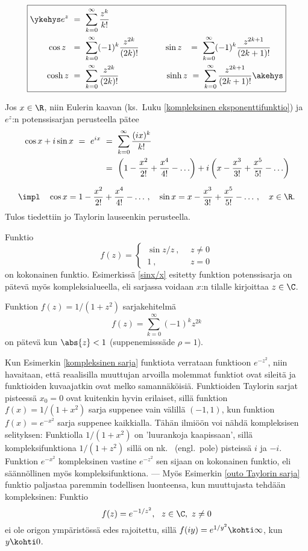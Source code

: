 \[ \boxed{ \begin{aligned}
  \ykehys e^z\ &=\ \sum_{k=0}^\infty \frac{z^k}{k!} \\
     \cos z\ \ &=\ \sum_{k=0}^\infty (-1)^k \frac{z^{2k}}{(2k)!} \qquad\quad 
    \sin z\,\ \ =\ \sum_{k=0}^\infty (-1)^k \frac{z^{2k+1}}{(2k+1)!} \quad \\
\quad \cosh z\ &=\ \sum_{k=0}^\infty \frac{z^{2k}}{(2k)!} \qquad\qquad\quad\,\
       \sinh z\ =\ \sum_{k=0}^\infty \frac{z^{2k+1}}{(2k+1)!} \akehys
           \end{aligned} } \]
\begin{Exa} Jos $x\in\R$, niin Eulerin kaavan
(ks.\ Luku \ref{kompleksinen eksponenttifunktio}) ja $e^z$:n potenssisarjan perusteella pätee
\begin{align*}
\cos x + i\sin x\ =\ e^{ix}\ &=\ \sum_{k=0}^\infty \frac{(ix)^k}{k!} \\
                            &=\ \left(1-\frac{x^2}{2!}+\frac{x^4}{4!}- \ldots \right)
                              + i\left(x-\frac{x^3}{3!}+\frac{x^5}{5!}- \ldots \right) \\[2mm]
\impl\quad \cos x = 1-\frac{x^2}{2!}&+\frac{x^4}{4!}-\ldots\,, \quad \sin x 
                  = x-\frac{x^3}{3!}+\frac{x^5}{5!}-\ldots\,, \quad x\in\R.
\end{align*}
Tulos tiedettiin jo Taylorin lauseenkin perusteella. \loppu
\end{Exa}
\begin{Exa} Funktio 
\[ 
f(z) = \begin{cases}  \ \sin z/z\ ,\ \ &z \neq 0 \\ \ 1\ , &z=0 \end{cases} 
\]
on kokonainen funktio. Esimerkissä \ref{sinx/x} esitetty funktion potenssisarja on pätevä myös
kompleksialueella, eli sarjassa voidaan $x$:n tilalle kirjoittaa $z \in \C$. 
\loppu \end{Exa}
\begin{Exa} \label{kompleksinen sarja} Funktion $f(z) = 1/(1+z^2)$ sarjakehitelmä
\[ f(z) = \sum_{k=0}^\infty (-1)^k z^{2k} \]
on pätevä kun $\abs{z}<1$ (suppenemisssäde $\rho=1$). \loppu
\end{Exa}
Kun Esimerkin \ref{kompleksinen sarja} funktiota verrataan funktioon $e^{-z^2}$, niin
havaitaan, että reaalisilla muuttujan arvoilla molemmat funktiot ovat sileitä ja funktioiden
kuvaajatkin ovat melko samannäköisiä. Funktioiden Taylorin sarjat pisteessä
$x_0=0$ ovat kuitenkin hyvin erilaiset, sillä funktion $f(x) = 1/(1+x^2)$ sarja suppenee vain
välillä $(-1,1)$, kun funktion $f(x) = e^{-x^2}$ sarja suppenee kaikkialla. Tähän ilmiöön voi
nähdä kompleksisen selityksen: Funktiolla $1/(1+x^2)$ on 'luurankoja kaapissaan', sillä
kompleksifunktiona $1/(1+z^2)$ sillä on nk.\ \kor{napa} (engl.\ pole) pisteissä $i$ ja $-i$.
Funktion $e^{-x^2}$ kompleksinen vastine $e^{-z^2}$ sen sijaan on kokonainen funktio, eli
säännöllinen myös kompleksifunktiona. --- Myös Esimerkin \ref{outo Taylorin sarja} funktio
paljastaa paremmin todellisen luonteensa, kun muuttujasta tehdään kompleksinen: Funktio
\[ 
f(z) = e^{-1/z^2},\ \ z \in \C,\ z \neq 0 
\]
ei ole origon ympäristössä edes rajoitettu, sillä $f(iy) = e^{1/y^2} \kohti \infty$, kun 
$y \kohti 0$.  

